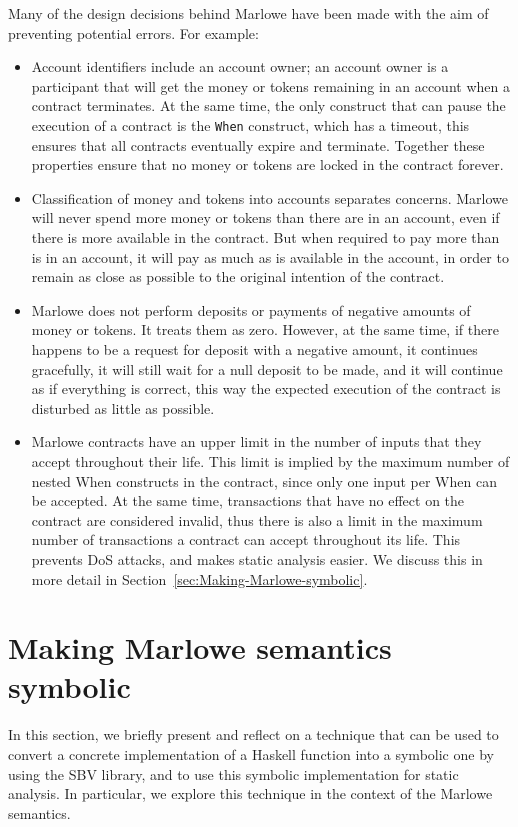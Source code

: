 \documentclass[english,runningheads]{llncs}
\begin{document}
Many of the design decisions behind Marlowe have been made with the
aim of preventing potential errors. For example:
\begin{itemize}
\item Account identifiers include an account owner; an account owner is
a participant that will get the money or tokens remaining in an account
when a contract terminates. At the same time, the only construct that
can pause the execution of a contract is the \texttt{When} construct,
which has a timeout, this ensures that all contracts eventually expire
and terminate. Together these properties ensure that no money or tokens
are locked in the contract forever.
\item Classification of money and tokens into accounts separates concerns.
Marlowe will never spend more money or tokens than there are in an
account, even if there is more available in the contract. But when
required to pay more than is in an account, it will pay as much as
is available in the account, in order to remain as close as possible
to the original intention of the contract.
\item Marlowe does not perform deposits or payments of negative amounts
of money or tokens. It treats them as zero. However, at the same time,
if there happens to be a request for deposit with a negative amount,
it continues gracefully, it will still wait for a null deposit to
be made, and it will continue as if everything is correct, this way
the expected execution of the contract is disturbed as little as possible.
\item Marlowe contracts have an upper limit in the number of inputs that
they accept throughout their life. This limit is implied by the maximum
number of nested When constructs in the contract, since only one input
per When can be accepted. At the same time, transactions that have
no effect on the contract are considered invalid, thus there is also
a limit in the maximum number of transactions a contract can accept
throughout its life. This prevents DoS attacks, and makes static analysis
easier. We discuss this in more detail in Section~\ref{sec:Making-Marlowe-symbolic}.
\end{itemize}

\section{Making Marlowe semantics symbolic\label{sec:Making-Marlowe-symbolic}}

In this section, we briefly present and reflect on a technique that
can be used to convert a concrete implementation of a Haskell function
into a symbolic one by using the SBV library, and to use this symbolic
implementation for static analysis. In particular, we explore this
technique in the context of the Marlowe semantics.
\end{document}
